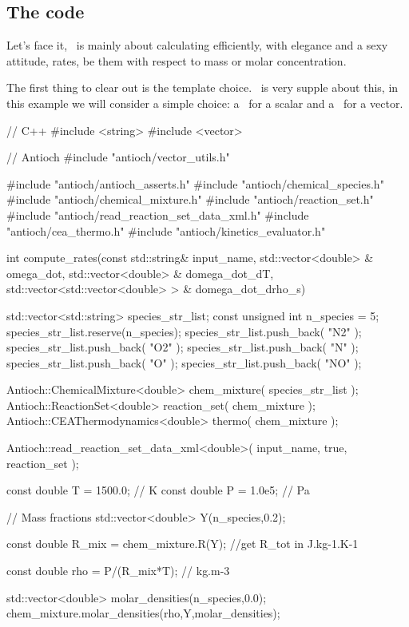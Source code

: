\subsection{The code}

Let's face it, \Antioch\ is mainly about calculating
efficiently, with elegance and a sexy attitude, rates,
be them with respect to mass or molar concentration. 

The first thing to clear out is the template choice. 
\Antioch\ is very supple about this, in this example
we will consider a simple choice: a \double\ for a 
scalar and a \stdvector\ for a vector.

\begin{cpp}
// C++
#include <string>
#include <vector>

// Antioch
#include "antioch/vector_utils.h"

#include "antioch/antioch_asserts.h"
#include "antioch/chemical_species.h"
#include "antioch/chemical_mixture.h"
#include "antioch/reaction_set.h"
#include "antioch/read_reaction_set_data_xml.h"
#include "antioch/cea_thermo.h"
#include "antioch/kinetics_evaluator.h"

int compute_rates(const std::string& input_name,
  std::vector<double> & omega_dot,
  std::vector<double> & domega_dot_dT,
  std::vector<std::vector<double> > & domega_dot_drho_s)
{
  std::vector<std::string> species_str_list;
  const unsigned int n_species = 5;
  species_str_list.reserve(n_species);
  species_str_list.push_back( "N2" );
  species_str_list.push_back( "O2" );
  species_str_list.push_back( "N" );
  species_str_list.push_back( "O" );
  species_str_list.push_back( "NO" );

  Antioch::ChemicalMixture<double> chem_mixture( species_str_list );
  Antioch::ReactionSet<double> reaction_set( chem_mixture );
  Antioch::CEAThermodynamics<double> thermo( chem_mixture );

  Antioch::read_reaction_set_data_xml<double>( input_name, true, 
                                               reaction_set );

  const double T = 1500.0; // K
  const double P = 1.0e5; // Pa

  // Mass fractions
  std::vector<double> Y(n_species,0.2);

  const double R_mix = chem_mixture.R(Y); //get R_tot in J.kg-1.K-1

  const double rho = P/(R_mix*T); // kg.m-3

  std::vector<double> molar_densities(n_species,0.0);
  chem_mixture.molar_densities(rho,Y,molar_densities);

}
\end{cpp}

